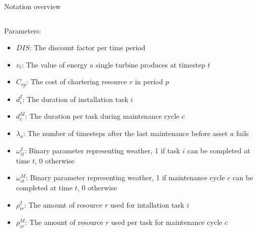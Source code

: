 \documentclass{beamer}
\begin{document}
\begin{frame}{Notation overview}
\begin{columns}
\begin{column}{.48\textwidth}
Parameters:
\begin{itemize}
\item $DIS$: The discount factor per time period
\item $v_t$: The value of energy a single turbine produces at timestep $t$
\item $C_{rp}$: The cost of chartering resource $r$ in period $p$
\item $d^I_i$: The duration of installation task $i$
\item $d^M_c$: The duration per task during maintenance cycle $c$
\item $\lambda_a$: The number of timesteps after the last maintenance before asset $a$ fails
\item $\omega^I_{it}$: Binary parameter representing weather, 1 if task $i$ can be completed at time $t$, 0 otherwise
\item $\omega^M_{ct}$: Binary parameter representing weather, 1 if maintenance cycle $c$ can be completed at time $t$, 0 otherwise
\item $\rho^I_{ir}$: The amount of resource $r$ used for intallation task $i$
\item $\rho^M_{cr}$: The amount of resource $r$ used per task for maintenance cycle $c$
\end{itemize}
\end{column}
\end{columns}

\end{frame}
\end{document}
